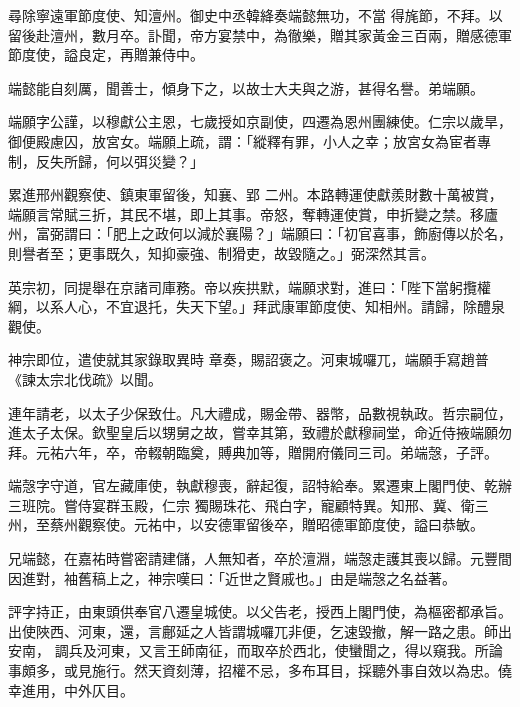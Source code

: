 \begin{pinyinscope}
 尋除寧遠軍節度使、知澶州。御史中丞韓絳奏端懿無功，不當
 得旄節，不拜。以留後赴澶州，數月卒。訃聞，帝方宴禁中，為徹樂，贈其家黃金三百兩，贈感德軍節度使，謚良定，再贈兼侍中。



 端懿能自刻厲，聞善士，傾身下之，以故士大夫與之游，甚得名譽。弟端願。



 端願字公謹，以穆獻公主恩，七歲授如京副使，四遷為恩州團練使。仁宗以歲旱，御便殿慮囚，放宮女。端願上疏，謂：「縱釋有罪，小人之幸；放宮女為宦者專制，反失所歸，何以弭災變？」



 累進邢州觀察使、鎮東軍留後，知襄、郢
 二州。本路轉運使獻羨財數十萬被賞，端願言常賦三折，其民不堪，即上其事。帝怒，奪轉運使賞，申折變之禁。移廬州，富弼謂曰：「肥上之政何以減於襄陽？」端願曰：「初官喜事，飾廚傳以於名，則譽者至；更事既久，知抑豪強、制猾吏，故毀隨之。」弼深然其言。



 英宗初，同提舉在京諸司庫務。帝以疾拱默，端願求對，進曰：「陛下當躬攬權綱，以系人心，不宜退托，失天下望。」拜武康軍節度使、知相州。請歸，除醴泉觀使。



 神宗即位，遣使就其家錄取異時
 章奏，賜詔褒之。河東城囉兀，端願手寫趙普《諫太宗北伐疏》以聞。



 連年請老，以太子少保致仕。凡大禮成，賜金帶、器幣，品數視執政。哲宗嗣位，進太子太保。欽聖皇后以甥舅之故，嘗幸其第，致禮於獻穆祠堂，命近侍掖端願勿拜。元祐六年，卒，帝輟朝臨奠，賻典加等，贈開府儀同三司。弟端愨，子評。



 端愨字守道，官左藏庫使，執獻穆喪，辭起復，詔特給奉。累遷東上閣門使、乾辦三班院。嘗侍宴群玉殿，仁宗
 獨賜珠花、飛白字，寵顧特異。知邢、冀、衛三州，至蔡州觀察使。元祐中，以安德軍留後卒，贈昭德軍節度使，謚曰恭敏。



 兄端懿，在嘉祐時嘗密請建儲，人無知者，卒於澶淵，端愨走護其喪以歸。元豐間因進對，袖舊稿上之，神宗嘆曰：「近世之賢戚也。」由是端愨之名益著。



 評字持正，由東頭供奉官八遷皇城使。以父告老，授西上閣門使，為樞密都承旨。出使陜西、河東，還，言鄜延之人皆謂城囉兀非便，乞速毀撤，解一路之患。師出安南，
 調兵及河東，又言王師南征，而取卒於西北，使蠻聞之，得以窺我。所論事頗多，或見施行。然天資刻薄，招權不忌，多布耳目，採聽外事自效以為忠。僥幸進用，中外仄目。




\end{pinyinscope}
